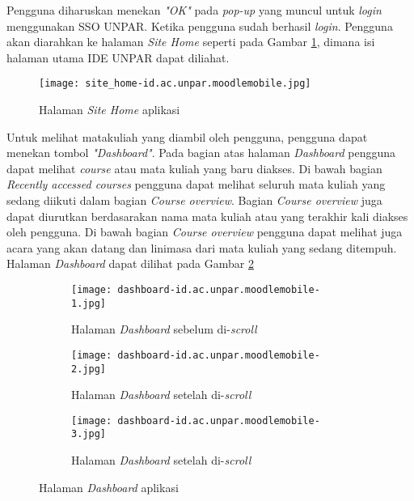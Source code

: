 Pengguna diharuskan menekan \textit{"OK"} pada \textit{pop-up} yang muncul untuk \textit{login} menggunakan SSO UNPAR. Ketika pengguna sudah berhasil \textit{login}. Pengguna akan diarahkan ke halaman \textit{Site Home} seperti pada Gambar \ref{app:site-home}, dimana isi halaman utama IDE UNPAR dapat diliahat. 

\begin{figure}[H] 
	\centering  
	\texttt{[image: site\_home-id.ac.unpar.moodlemobile.jpg]}  
	\caption[Halaman \textit{Site Home} aplikasi] {Halaman \textit{Site Home} aplikasi} 
	\label{app:site-home} 
\end{figure}  

Untuk melihat matakuliah yang diambil oleh pengguna, pengguna dapat menekan tombol \textit{"Dashboard"}. Pada bagian atas halaman \textit{Dashboard} pengguna dapat melihat \textit{course} atau mata kuliah yang baru diakses. Di bawah bagian \textit{Recently accessed courses} pengguna dapat melihat seluruh mata kuliah yang sedang diikuti dalam bagian \textit{Course overview}. Bagian \textit{Course overview} juga dapat diurutkan berdasarakan nama mata kuliah atau yang terakhir kali diakses oleh pengguna. Di bawah bagian \textit{Course overview} pengguna dapat melihat juga acara yang akan datang dan linimasa dari mata kuliah yang sedang ditempuh. Halaman \textit{Dashboard} dapat dilihat pada Gambar \ref{app:dashboard}

\begin{figure}[H]
	\centering  
	\begin{subfigure}[ht]{.3\textwidth}
	\centering
	\texttt{[image: dashboard-id.ac.unpar.moodlemobile-1.jpg]} 
	\caption{Halaman \textit{Dashboard} sebelum di-\textit{scroll}}
	\end{subfigure}
	\hfill
	\begin{subfigure}[ht]{.3\textwidth}
	\centering
	\texttt{[image: dashboard-id.ac.unpar.moodlemobile-2.jpg]} 
	\caption{Halaman \textit{Dashboard} setelah di-\textit{scroll}}
	\end{subfigure}
	\hfill
	\begin{subfigure}[ht]{.3\textwidth}
	\centering
	\texttt{[image: dashboard-id.ac.unpar.moodlemobile-3.jpg]} 
	\caption{Halaman \textit{Dashboard} setelah di-\textit{scroll}}
	\end{subfigure}

	\caption[Halaman \textit{Dashboard} aplikasi] {Halaman \textit{Dashboard} aplikasi} 
	\label{app:dashboard} 
\end{figure}  


